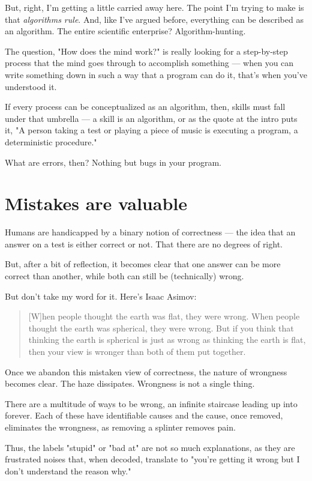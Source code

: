 But, right, I'm getting a little carried away here. The point I'm trying to make
is that \textit{algorithms rule}. And, like I've argued before, everything can be
described as an algorithm. The entire scientific enterprise? Algorithm-hunting.

The question, "How does the mind work?" is really looking for a step-by-step
process that the mind goes through to accomplish something --- when you can write
something down in such a way that a program can do it, that's when you've
understood it.

If every process can be conceptualized as an algorithm, then, skills must fall
under that umbrella --- a skill is an algorithm, or as the quote at the intro
puts it, "A person taking a test or playing a piece of music is executing a
program, a deterministic procedure."

What are errors, then? Nothing but bugs in your program.

\section{Mistakes are valuable}

Humans are handicapped by a binary notion of correctness --- the idea that an
answer on a test is either correct or not. That there are no degrees of right.

But, after a bit of reflection, it becomes clear that one answer can be more
correct than another, while both can still be (technically) wrong.

But don't take my word for it. Here's Isaac Asimov:

\begin{quote}
[W]hen people thought the earth was flat, they were wrong. When people thought
the earth was spherical, they were wrong. But if you think that thinking the
earth is spherical is just as wrong as thinking the earth is flat, then your
view is wronger than both of them put together.
\end{quote}
  
Once we abandon this mistaken view of correctness, the nature of
wrongness becomes clear. The haze dissipates. Wrongness is not a single thing.

There are a multitude of ways to be wrong, an infinite staircase leading up into
forever. Each of these have identifiable causes and the cause, once removed, eliminates the
wrongness, as removing a splinter removes pain.

Thus, the labels "stupid" or "bad at" are not so much explanations, as
they are frustrated noises that, when decoded, translate to "you're getting it
wrong but I don't understand the reason why."

